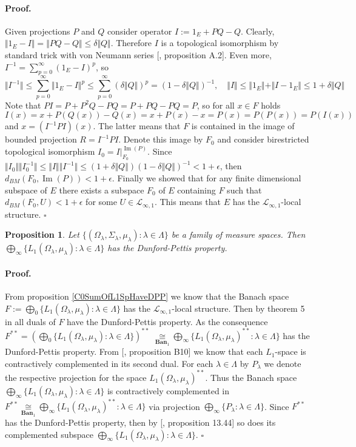 \documentclass[12pt]{article}
\newcommand{\isom}[1]{\mathop{\mathbin{\cong}}\limits_{#1}}
\newtheorem{proposition}[theorem]{Proposition}
\renewenvironment{proof}{\paragraph{Proof.}}{\hfill$\square$\medskip}
\begin{document}
\begin{proof}
Given projections $P$ and $Q$ consider operator $I:=1_E+PQ-Q$. Clearly, $\Vert 1_E-I\Vert=\Vert PQ-Q\Vert\leq \delta\Vert Q\Vert$. Therefore $I$ is a topological isomorphism by standard trick with von Neumann series [\cite{KalAlbTopicsBanSpTh},  proposition A.2]. Even more, $I^{-1}=\sum_{p=0}^\infty(1_E-I)^p$, so
$$
\Vert I^{-1}\Vert\leq\sum_{p=0}^\infty\Vert 1_E-I\Vert^p\leq\sum_{p=0}^\infty(\delta\Vert Q\Vert)^p=(1-\delta\Vert Q\Vert)^{-1},
\quad
\Vert I\Vert\leq\Vert 1_E\Vert+\Vert I-1_E\Vert\leq 1+\delta\Vert Q\Vert
$$
Note that $PI=P+P^2Q-PQ=P+PQ-PQ=P$, so for all $x\in F$ holds 
$$
I(x)=x+P(Q(x))-Q(x)=x+P(x)-x=P(x)=P(P(x))=P(I(x))
$$
and $x=(I^{-1}PI)(x)$. The latter means that $F$ is contained in the image of bounded projection $R=I^{-1}PI$. Denote this image by $F_0$ and consider birestricted topological isomorphism $I_0=I|_{F_0}^{\operatorname{Im}(P)}$. Since $\Vert I_0\Vert\Vert I_0^{-1}\Vert\leq\Vert I\Vert\Vert I^{-1}\Vert\leq(1+\delta\Vert Q\Vert)(1-\delta\Vert Q\Vert)^{-1}<1+\epsilon$, then $d_{BM}(F_0,\operatorname{Im}(P))<1+\epsilon$. Finally we showed that for any finite dimensional subspace of $E$ there exists a subspace $F_0$ of $E$ containing $F$ such that $d_{BM}(F_0,U)<1+\epsilon$ for some $U\in\mathcal{L}_{\infty,1}$. This means that $E$ has the $\mathcal{L}_{\infty,1}$-local structure.
\end{proof}

\begin{proposition}\label{ProdOfL1SpHaveDPP} Let $\{(\Omega_\lambda,\Sigma_\lambda,\mu_\lambda):\lambda\in\Lambda\}$ be a family of measure spaces. Then $\bigoplus_\infty\{L_1(\Omega_\lambda,\mu_\lambda):\lambda\in\Lambda\}$ has the Dunford-Pettis property.
\end{proposition}
\begin{proof} From proposition \ref{C0SumOfL1SpHaveDPP} we know that the Banach space $F:=\bigoplus_0\{L_1(\Omega_\lambda,\mu_\lambda):\lambda\in\Lambda\}$ has the $\mathcal{L}_{\infty,1}$-local structure. Then by theorem 5 in \cite{BourgOnTheDPP} all duals of $F$ have the Dunford-Pettis property. As the consequence $F^{**}=\left(\bigoplus_0\{L_1(\Omega_\lambda,\mu_\lambda):\lambda\in\Lambda\}\right)^{**}$ $\isom{\mathbf{Ban}_1}\bigoplus_\infty\{L_1(\Omega_\lambda,\mu_\lambda)^{**}:\lambda\in\Lambda\}$ has the Dunford-Pettis property. From [\cite{DefFloTensNorOpId}, proposition B10] we know that each $L_1$-space is contractively complemented in its second dual. For each $\lambda\in\Lambda$ by $P_\lambda$ we denote the respective projection for the space $L_1(\Omega_\lambda,\mu_\lambda)^{**}$. Thus the Banach space $\bigoplus_\infty\{L_1(\Omega_\lambda,\mu_\lambda):\lambda\in\Lambda\}$ is contractively complemented in $F^{**}\isom{\mathbf{Ban}_1}\bigoplus_\infty\{L_1(\Omega_\lambda,\mu_\lambda)^{**}:\lambda\in\Lambda\}$ via projection $\bigoplus_\infty \{P_\lambda:\lambda\in\Lambda\}$. Since $F^{**}$ has the Dunford-Pettis property, then by [\cite{FabHabBanSpTh}, proposition 13.44] so does its complemented subspace $\bigoplus_\infty\{L_1(\Omega_\lambda,\mu_\lambda):\lambda\in\Lambda\}$.
\end{proof}
\end{document}
